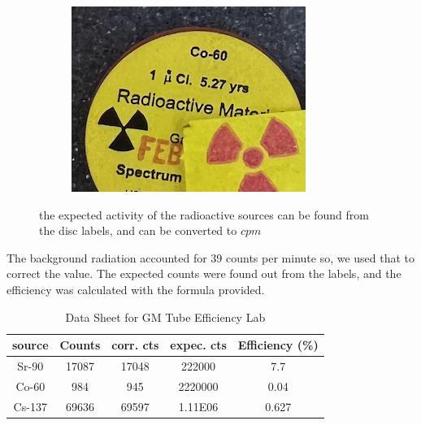 \documentclass[twocolumn]{article}
\begin{document}
\begin{figure}[htbp]
\begin{minipage}[t]{0.45\linewidth}
\begin{subfigure}{\linewidth}
        \end{subfigure}
    \end{minipage}
    \hfill
    \begin{minipage}[t]{0.57\linewidth}
        \centering
        \begin{subfigure}{\linewidth}
            \includegraphics[width=\linewidth]{lab5_b.png}
           
        \end{subfigure}
    \end{minipage}
    \caption{the expected activity of the radioactive sources can be found from the disc labels, and can be converted to $cpm$}
\end{figure}

The background radiation accounted for 39 counts per minute so, we used that to correct the value. The expected counts were found out from the labels, and the efficiency was calculated with the formula provided.

\begin{table}[h!]

  \caption{Data Sheet for GM Tube Efficiency Lab}
  \begin{tabular}{|c|c|c|c|c|}
    \hline
    \textbf{source} & \textbf{Counts} & \textbf{corr. cts} & \textbf{expec. cts} & \textbf{Efficiency (\%)} \\
    \hline
    Sr-90 & 17087 & 17048 & 222000 & 7.7 \\
    \hline
    Co-60 & 984 & 945 & 2220000 & 0.04 \\
    \hline
    Cs-137 & 69636 & 69597 & 1.11E06 & 0.627 \\
    \hline
  \end{tabular}
\end{table}
\end{document}
